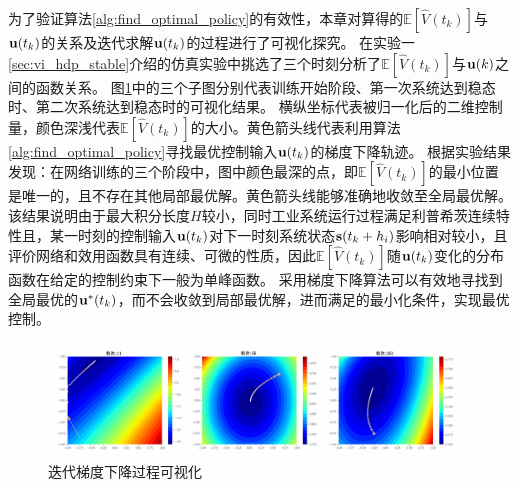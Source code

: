 为了验证算法\ref{alg:find_optimal_policy}的有效性，本章对算得的$\mathbb{E}[\hat{V}(t_k)]$与${\mathbf u}(t_k)$的关系及迭代求解$\mathbf u({t_k})$的过程进行了可视化探究。
在实验一\ref{sec:vi_hdp_stable}介绍的仿真实验中挑选了三个时刻分析了$\mathbb{E}[\hat{V}(t_k)]$与${\mathbf u}(k)$之间的函数关系。
图\ref{fig:J_u_cmp}中的三个子图分别代表训练开始阶段、第一次系统达到稳态时、第二次系统达到稳态时的可视化结果。
横纵坐标代表被归一化后的二维控制量，颜色深浅代表$\mathbb{E}[\hat{V}(t_k)]$的大小。黄色箭头线代表利用算法\ref{alg:find_optimal_policy}寻找最优控制输入${\mathbf
u}(t_k)$的梯度下降轨迹。
根据实验结果发现：在网络训练的三个阶段中，图中颜色最深的点，即$\mathbb{E}[\hat{V}(t_k)]$的最小位置是唯一的，且不存在其他局部最优解。黄色箭头线能够准确地收敛至全局最优解。该结果说明由于最大积分长度$H$较小，同时工业系统运行过程满足利普希茨连续特性且，某一时刻的控制输入${\mathbf
u}(t_k)$对下一时刻系统状态$\mathbf
s(t_k+h_i)$影响相对较小，且评价网络和效用函数具有连续、可微的性质，因此$\mathbb{E}[\hat{V}(t_k)]$随${\mathbf
u}(t_k)$变化的分布函数在给定的控制约束下一般为单峰函数。
采用梯度下降算法可以有效地寻找到全局最优的$\mathbf u^*(t_k)$，而不会收敛到局部最优解，进而满足的最小化条件，实现最优控制。

\begin{figure}[htb]
    \centering
    \includegraphics[width=\linewidth]{figures/chapter6/fig4.pdf}
    \caption{迭代梯度下降过程可视化}
\label{fig:J_u_cmp}
\end{figure}
